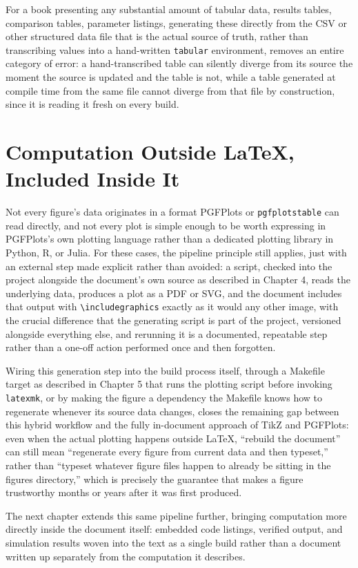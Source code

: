 For a book presenting any substantial amount of tabular data, results tables, comparison tables, parameter listings, generating these directly from the CSV or other structured data file that is the actual source of truth, rather than transcribing values into a hand-written \texttt{tabular} environment, removes an entire category of error: a hand-transcribed table can silently diverge from its source the moment the source is updated and the table is not, while a table generated at compile time from the same file cannot diverge from that file by construction, since it is reading it fresh on every build.

\hypertarget{computation-outside-latex-included-inside-it}{%
\section{Computation Outside LaTeX, Included Inside It}\label{computation-outside-latex-included-inside-it}}

Not every figure's data originates in a format PGFPlots or \texttt{pgfplotstable} can read directly, and not every plot is simple enough to be worth expressing in PGFPlots's own plotting language rather than a dedicated plotting library in Python, R, or Julia. For these cases, the pipeline principle still applies, just with an external step made explicit rather than avoided: a script, checked into the project alongside the document's own source as described in Chapter 4, reads the underlying data, produces a plot as a PDF or SVG, and the document includes that output with \texttt{\textbackslash{}includegraphics} exactly as it would any other image, with the crucial difference that the generating script is part of the project, versioned alongside everything else, and rerunning it is a documented, repeatable step rather than a one-off action performed once and then forgotten.

Wiring this generation step into the build process itself, through a Makefile target as described in Chapter 5 that runs the plotting script before invoking \texttt{latexmk}, or by making the figure a dependency the Makefile knows how to regenerate whenever its source data changes, closes the remaining gap between this hybrid workflow and the fully in-document approach of TikZ and PGFPlots: even when the actual plotting happens outside LaTeX, ``rebuild the document'' can still mean ``regenerate every figure from current data and then typeset,'' rather than ``typeset whatever figure files happen to already be sitting in the figures directory,'' which is precisely the guarantee that makes a figure trustworthy months or years after it was first produced.

The next chapter extends this same pipeline further, bringing computation more directly inside the document itself: embedded code listings, verified output, and simulation results woven into the text as a single build rather than a document written up separately from the computation it describes.
